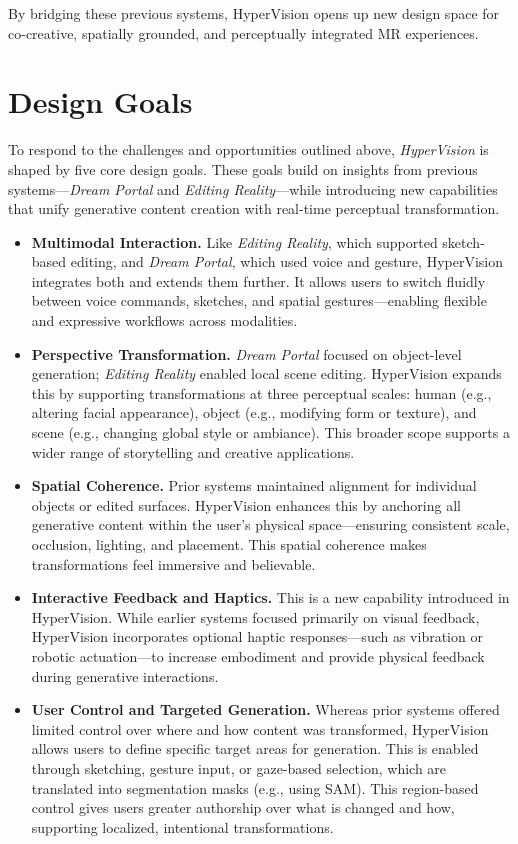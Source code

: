 By bridging these previous systems, HyperVision opens up new design space for co-creative, spatially grounded, and perceptually integrated MR experiences.

\section{Design Goals}

To respond to the challenges and opportunities outlined above, \textit{HyperVision} is shaped by five core design goals. These goals build on insights from previous systems—\textit{Dream Portal} and \textit{Editing Reality}—while introducing new capabilities that unify generative content creation with real-time perceptual transformation.

\begin{itemize}
    \item \textbf{Multimodal Interaction.} 
    Like \textit{Editing Reality}, which supported sketch-based editing, and \textit{Dream Portal}, which used voice and gesture, HyperVision integrates both and extends them further. It allows users to switch fluidly between voice commands, sketches, and spatial gestures—enabling flexible and expressive workflows across modalities.

    \item \textbf{Perspective Transformation.} 
    \textit{Dream Portal} focused on object-level generation; \textit{Editing Reality} enabled local scene editing. HyperVision expands this by supporting transformations at three perceptual scales: human (e.g., altering facial appearance), object (e.g., modifying form or texture), and scene (e.g., changing global style or ambiance). This broader scope supports a wider range of storytelling and creative applications.

    \item \textbf{Spatial Coherence.} 
    Prior systems maintained alignment for individual objects or edited surfaces. HyperVision enhances this by anchoring all generative content within the user’s physical space—ensuring consistent scale, occlusion, lighting, and placement. This spatial coherence makes transformations feel immersive and believable.

    \item \textbf{Interactive Feedback and Haptics.} 
    This is a new capability introduced in HyperVision. While earlier systems focused primarily on visual feedback, HyperVision incorporates optional haptic responses—such as vibration or robotic actuation—to increase embodiment and provide physical feedback during generative interactions.

    \item \textbf{User Control and Targeted Generation.} 
    Whereas prior systems offered limited control over where and how content was transformed, HyperVision allows users to define specific target areas for generation. This is enabled through sketching, gesture input, or gaze-based selection, which are translated into segmentation masks (e.g., using SAM). This region-based control gives users greater authorship over what is changed and how, supporting localized, intentional transformations.
\end{itemize}

